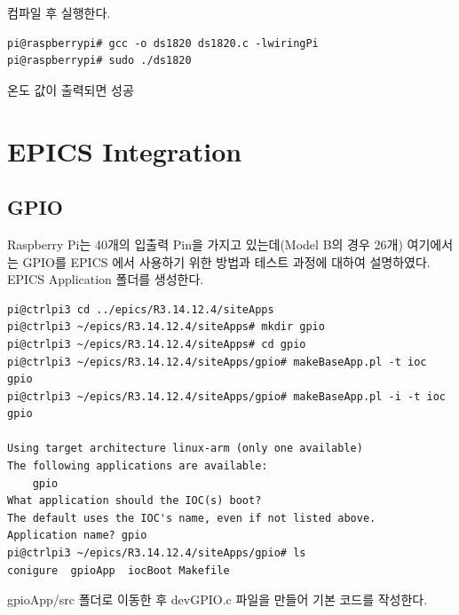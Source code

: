 \documentclass[11pt
  , a4paper
  , article
  , oneside
]{memoir}
\begin{document}
컴파일 후 실행한다.
\begin{lstlisting}[style=termstyle]
pi@raspberrypi# gcc -o ds1820 ds1820.c -lwiringPi
pi@raspberrypi# sudo ./ds1820
\end{lstlisting}
온도 값이 출력되면 성공
\chapter{EPICS Integration}
\section{GPIO}
Raspberry Pi는 40개의 입출력 Pin을 가지고 있는데(Model B의 경우 26개) 여기에서는 GPIO를 EPICS 에서 
사용하기 위한 방법과 테스트 과정에 대하여 설명하였다.\\
EPICS Application 폴더를 생성한다. 
\begin{lstlisting}[style=termstyle]
pi@ctrlpi3 cd ../epics/R3.14.12.4/siteApps
pi@ctrlpi3 ~/epics/R3.14.12.4/siteApps# mkdir gpio
pi@ctrlpi3 ~/epics/R3.14.12.4/siteApps# cd gpio
pi@ctrlpi3 ~/epics/R3.14.12.4/siteApps/gpio# makeBaseApp.pl -t ioc gpio
pi@ctrlpi3 ~/epics/R3.14.12.4/siteApps/gpio# makeBaseApp.pl -i -t ioc gpio

Using target architecture linux-arm (only one available)
The following applications are available:
    gpio
What application should the IOC(s) boot?
The default uses the IOC's name, even if not listed above.
Application name? gpio
pi@ctrlpi3 ~/epics/R3.14.12.4/siteApps/gpio# ls
conigure  gpioApp  iocBoot Makefile
\end{lstlisting}
gpioApp/src 폴더로 이동한 후 devGPIO.c 파일을 만들어 기본 코드를 작성한다.
\end{document}
